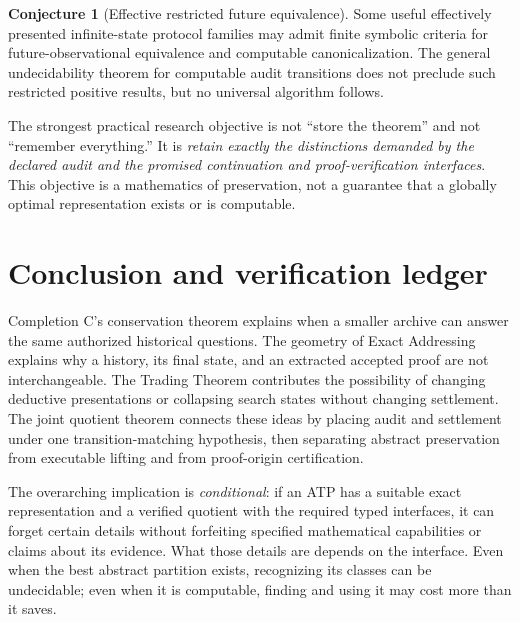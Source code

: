 \documentclass[11pt,letterpaper]{article}
\theoremstyle{definition}
\newtheorem{conjecture}[theorem]{Conjecture}
\begin{document}
\begin{conjecture}[Effective restricted future equivalence]
Some useful effectively presented infinite-state protocol families may admit finite symbolic criteria for future-observational equivalence and computable canonicalization. The general undecidability theorem for computable audit transitions does not preclude such restricted positive results, but no universal algorithm follows.
\end{conjecture}

The strongest practical research objective is not ``store the theorem'' and not ``remember everything.'' It is \emph{retain exactly the distinctions demanded by the declared audit and the promised continuation and proof-verification interfaces}. This objective is a mathematics of preservation, not a guarantee that a globally optimal representation exists or is computable.

\section{Conclusion and verification ledger}
Completion C's conservation theorem explains when a smaller archive can answer the same authorized historical questions. The geometry of Exact Addressing explains why a history, its final state, and an extracted accepted proof are not interchangeable. The Trading Theorem contributes the possibility of changing deductive presentations or collapsing search states without changing settlement. The joint quotient theorem connects these ideas by placing audit and settlement under one transition-matching hypothesis, then separating abstract preservation from executable lifting and from proof-origin certification.

The overarching implication is \emph{conditional}: if an ATP has a suitable exact representation and a verified quotient with the required typed interfaces, it can forget certain details without forfeiting specified mathematical capabilities or claims about its evidence. What those details are depends on the interface. Even when the best abstract partition exists, recognizing its classes can be undecidable; even when it is computable, finding and using it may cost more than it saves.
\end{document}
